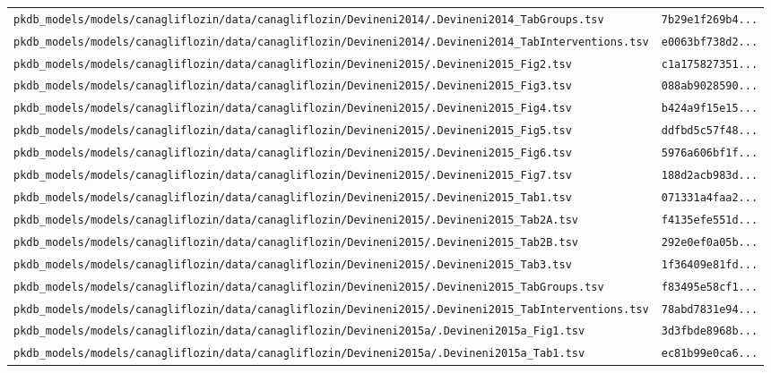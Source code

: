 \begin{longtable}{ll}
\texttt{pkdb\_models/models/canagliflozin/data/canagliflozin/Devineni2014/.Devineni2014\_TabGroups.tsv} & \texttt{7b29e1f269b4...} \\
\texttt{pkdb\_models/models/canagliflozin/data/canagliflozin/Devineni2014/.Devineni2014\_TabInterventions.tsv} & \texttt{e0063bf738d2...} \\
\texttt{pkdb\_models/models/canagliflozin/data/canagliflozin/Devineni2015/.Devineni2015\_Fig2.tsv} & \texttt{c1a175827351...} \\
\texttt{pkdb\_models/models/canagliflozin/data/canagliflozin/Devineni2015/.Devineni2015\_Fig3.tsv} & \texttt{088ab9028590...} \\
\texttt{pkdb\_models/models/canagliflozin/data/canagliflozin/Devineni2015/.Devineni2015\_Fig4.tsv} & \texttt{b424a9f15e15...} \\
\texttt{pkdb\_models/models/canagliflozin/data/canagliflozin/Devineni2015/.Devineni2015\_Fig5.tsv} & \texttt{ddfbd5c57f48...} \\
\texttt{pkdb\_models/models/canagliflozin/data/canagliflozin/Devineni2015/.Devineni2015\_Fig6.tsv} & \texttt{5976a606bf1f...} \\
\texttt{pkdb\_models/models/canagliflozin/data/canagliflozin/Devineni2015/.Devineni2015\_Fig7.tsv} & \texttt{188d2acb983d...} \\
\texttt{pkdb\_models/models/canagliflozin/data/canagliflozin/Devineni2015/.Devineni2015\_Tab1.tsv} & \texttt{071331a4faa2...} \\
\texttt{pkdb\_models/models/canagliflozin/data/canagliflozin/Devineni2015/.Devineni2015\_Tab2A.tsv} & \texttt{f4135efe551d...} \\
\texttt{pkdb\_models/models/canagliflozin/data/canagliflozin/Devineni2015/.Devineni2015\_Tab2B.tsv} & \texttt{292e0ef0a05b...} \\
\texttt{pkdb\_models/models/canagliflozin/data/canagliflozin/Devineni2015/.Devineni2015\_Tab3.tsv} & \texttt{1f36409e81fd...} \\
\texttt{pkdb\_models/models/canagliflozin/data/canagliflozin/Devineni2015/.Devineni2015\_TabGroups.tsv} & \texttt{f83495e58cf1...} \\
\texttt{pkdb\_models/models/canagliflozin/data/canagliflozin/Devineni2015/.Devineni2015\_TabInterventions.tsv} & \texttt{78abd7831e94...} \\
\texttt{pkdb\_models/models/canagliflozin/data/canagliflozin/Devineni2015a/.Devineni2015a\_Fig1.tsv} & \texttt{3d3fbde8968b...} \\
\texttt{pkdb\_models/models/canagliflozin/data/canagliflozin/Devineni2015a/.Devineni2015a\_Tab1.tsv} & \texttt{ec81b99e0ca6...} \\

\end{longtable}
